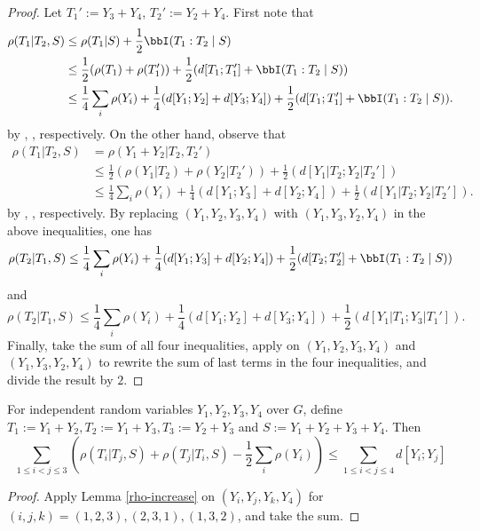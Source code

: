 \begin{proof}\leanok
  Let $T_1':=Y_3+Y_4$, $T_2':=Y_2+Y_4$.
  First note that
  \begin{align*}
    \rho(T_1|T_2,S)
    &\le \rho(T_1|S) + \frac{1}{2}\bbI(T_1:T_2\mid S)  \\
    &\le \frac{1}{2}(\rho(T_1)+\rho(T_1'))+\frac{1}{2}(d[T_1;T_1']+\bbI(T_1:T_2\mid S)) \\
    &\le \frac{1}{4} \sum_{i} \rho(Y_i) +\frac{1}{4}(d[Y_1;Y_2]+d[Y_3;Y_4]) + \frac{1}{2}(d[T_1;T_1']+\bbI(T_1:T_2\mid S)).
  \end{align*}
  by , ,  respectively.
  On the other hand, observe that
  \begin{align*}
    \rho(T_1|T_2,S)
    &=\rho(Y_1+Y_2|T_2,T_2') \\
    &\le \frac{1}{2}(\rho(Y_1|T_2)+\rho(Y_2|T_2'))+\frac{1}{2}(d[Y_1|T_2;Y_2|T_2'])  \\
    &\le \frac{1}{4} \sum_{i} \rho(Y_i) +\frac{1}{4}(d[Y_1;Y_3]+d[Y_2;Y_4]) + \frac{1}{2}(d[Y_1|T_2;Y_2|T_2']).
  \end{align*}
  by , ,  respectively.
  By replacing $(Y_1,Y_2,Y_3,Y_4)$ with $(Y_1,Y_3,Y_2,Y_4)$ in the above inequalities, one has
  $$\rho(T_2|T_1,S) \le \frac{1}{4} \sum_{i} \rho(Y_i) +\frac{1}{4}(d[Y_1;Y_3]+d[Y_2;Y_4]) + \frac{1}{2}(d[T_2;T_2']+\bbI(T_1:T_2\mid S))$$
  and
  $$\rho(T_2|T_1,S) \le \frac{1}{4} \sum_{i} \rho(Y_i) +\frac{1}{4}(d[Y_1;Y_2]+d[Y_3;Y_4]) + \frac{1}{2}(d[Y_1|T_1;Y_3|T_1']).$$
  Finally, take the sum of all four inequalities, apply  on $(Y_1,Y_2,Y_3,Y_4)$ and $(Y_1,Y_3,Y_2,Y_4)$ to rewrite the sum of last terms in the four inequalities, and divide the result by $2$.
\end{proof}

\begin{lemma}\label{rho-increase-symmetrized}\leanok
  For independent random variables $Y_1,Y_2,Y_3,Y_4$ over $G$, define $T_1:=Y_1+Y_2,T_2:=Y_1+Y_3,T_3:=Y_2+Y_3$ and $S:=Y_1+Y_2+Y_3+Y_4$. Then
  $$\sum_{1 \leq i<j \leq 3} (\rho(T_i|T_j,S) + \rho(T_j|T_i,S) -  \frac{1}{2}\sum_{i} \rho(Y_i))\le \sum_{1\leq i < j \leq 4}d[Y_i;Y_j]$$
\end{lemma}

\begin{proof}\leanok
  Apply Lemma \ref{rho-increase} on $(Y_i,Y_j,Y_k,Y_4)$ for $(i,j,k)=(1,2,3),(2,3,1),(1,3,2)$, and take the sum.
\end{proof}

